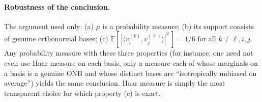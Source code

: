 \documentclass{amsart}
\theoremstyle{definition}
\begin{document}
\paragraph{Robustness of the conclusion.}
The argument used only: (a) $\mu$ is a probability measure; (b) its support consists of genuine
orthonormal bases; (c) $\widetilde{\mathbb{E}}[\,|\langle v^{(k)}_i,v^{(\ell)}_j\rangle|^2\,]=1/6$
for all $k\ne\ell,i,j$. Any probability measure with these three properties (for instance, one
need not even use Haar measure on each basis, only a measure each of whose marginals on a basis
is a genuine ONB and whose distinct bases are ``isotropically unbiased on average'') yields the
same conclusion. Haar measure is simply the most transparent choice for which
property (c) is exact.
\end{document}
